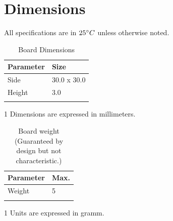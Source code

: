 \documentclass[10pt]{datasheet}
\begin{document}
\section{Dimensions}
All specifications are in $25\degree C$  unless otherwise noted.
\begin{table}[h]
\caption{Board Dimensions}
\begin{tabularx}{\textwidth}{l | X}
    \thickhline
    \textbf{Parameter} & \textbf{Size} \hspace{5cm} \\
    \hline
    Side & 30.0 x 30.0  \\
	Height & 3.0 \\
    \thickhline
\end{tabularx}
	\begin{tablenotes}
	\item[1]{Dimensions are expressed in millimeters.}
	\end{tablenotes}
\end{table}


\begin{table}[h]
\caption{Board weight (Guaranteed by design but not characteristic.)}
\begin{tabularx}{\textwidth}{l | X}
    \thickhline
	\textbf{Parameter} & \textbf{Max.}  \hspace{5cm} \\
    \hline
	Weight & 5 \\
	
    \thickhline
\end{tabularx}
	\begin{tablenotes}
	\item[1]{Units are expressed in gramm.}
	\end{tablenotes}
\end{table}


\newpage
\end{document}
